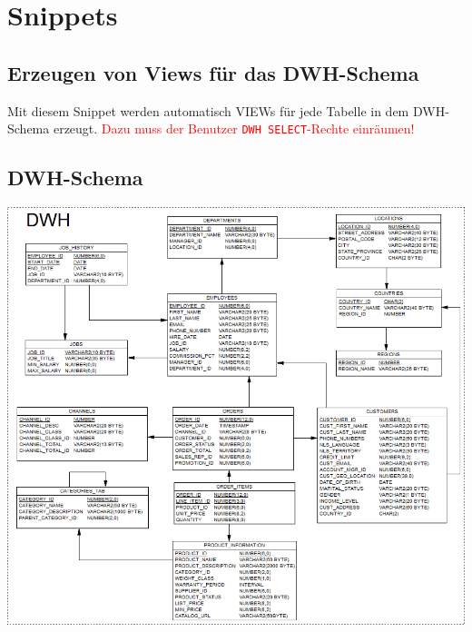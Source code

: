 \appendix
\section{Snippets}
\label{sec:snippets}

\subsection{Erzeugen von Views für das DWH-Schema}
\label{sec:snippets.dwh-views}
Mit diesem Snippet werden automatisch VIEWs für jede Tabelle in dem DWH-Schema erzeugt. \textcolor{red}{Dazu muss der Benutzer \texttt{DWH SELECT}-Rechte einräumen!}


\subsection{DWH-Schema}
\label{sec:schemata.dwh}
\includegraphics[width=1.0\textwidth]{img/dwh_schema.png}

